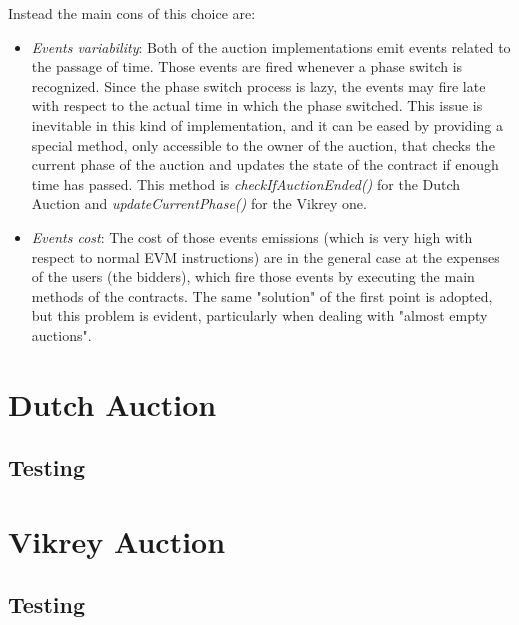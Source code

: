 \documentclass[11pt, a4paper]{report}
\begin{document}
	Instead the main cons of this choice are:
	\begin{itemize}
		\item \emph{Events variability}: Both of the auction implementations emit events related to the passage of time. Those events are fired whenever a phase switch is recognized. Since the phase switch process is lazy, the events may fire late with respect to the actual time in which the phase switched. This issue is inevitable in this kind of implementation, and it can be eased by providing a special method, only accessible to the owner of the auction, that checks the current phase of the auction and updates the state of the contract if enough time has passed. This method is \emph{checkIfAuctionEnded()} for the Dutch Auction and \emph{updateCurrentPhase()} for the Vikrey one.
		\item \emph{Events cost}: The cost of those events emissions (which is very high with respect to normal EVM instructions) are in the general case at the expenses of the users (the bidders), which fire those events by executing the main methods of the contracts. The same "solution" of the first point is adopted, but this problem is evident, particularly when dealing with "almost empty auctions".
	\end{itemize}

\section*{Dutch Auction}
\subsection*{Testing}

\section*{Vikrey Auction}
\subsection*{Testing}

	
	
\end{document}
